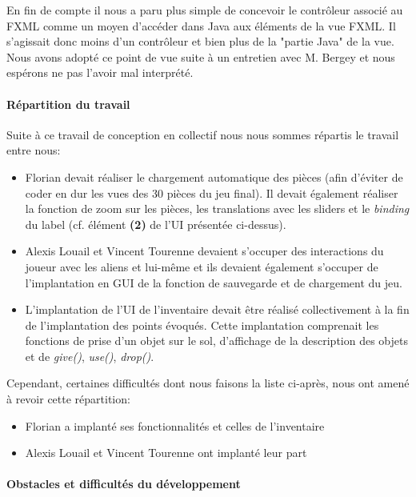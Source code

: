 \documentclass[./standalone.tex]{subfiles}
\begin{document}
En fin de compte il nous a paru plus simple de concevoir le contrôleur associé au FXML comme un moyen d'accéder dans Java aux éléments de la vue FXML. Il s'agissait donc moins d'un contrôleur et bien plus de la "partie Java" de la vue. Nous avons adopté ce point de vue suite à un entretien avec M. Bergey et nous espérons ne pas l'avoir mal interprété.\\


\paragraph{Répartition du travail\\}
Suite à ce travail de conception en collectif nous nous sommes répartis le travail entre nous:
\begin{itemize}
	\item Florian devait réaliser le chargement automatique des pièces (afin d'éviter de coder en dur les vues des 30 pièces du jeu final). Il devait également réaliser la fonction de zoom sur les pièces, les translations avec les sliders et le \textit{binding} du label (cf. élément \textbf{(2)} de l'UI présentée ci-dessus).
	\item Alexis Louail et Vincent Tourenne devaient s'occuper des interactions du joueur avec les aliens et lui-même et ils devaient également s'occuper de l'implantation en GUI de la fonction de sauvegarde et de chargement du jeu.
	\item L'implantation de l'UI de l'inventaire devait être réalisé collectivement à la fin de l'implantation des points évoqués. Cette implantation comprenait les fonctions de prise d'un objet sur le sol, d'affichage de la description des objets et de \textit{give()}, \textit{use()}, \textit{drop()}.\\
\end{itemize}

Cependant, certaines difficultés dont nous faisons la liste ci-après, nous ont amené à revoir cette répartition:
\begin{itemize}
	\item Florian a implanté ses fonctionnalités et celles de l'inventaire
	\item Alexis Louail et Vincent Tourenne ont implanté leur part\\
\end{itemize}
 
\paragraph{Obstacles et difficultés du développement\\}
\end{document}
